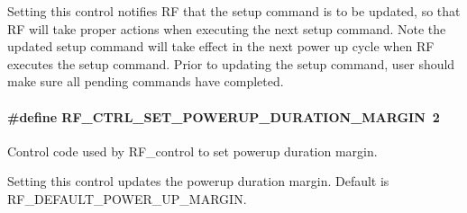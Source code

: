 Setting this control notifies R\+F that the setup command is to be updated, so that R\+F will take proper actions when executing the next setup command. Note the updated setup command will take effect in the next power up cycle when R\+F executes the setup command. Prior to updating the setup command, user should make sure all pending commands have completed. 
\paragraph[{R\+F\+\_\+\+C\+T\+R\+L\+\_\+\+S\+E\+T\+\_\+\+P\+O\+W\+E\+R\+U\+P\+\_\+\+D\+U\+R\+A\+T\+I\+O\+N\+\_\+\+M\+A\+R\+G\+I\+N}]{\setlength{\rightskip}{0pt plus 5cm}\#define R\+F\+\_\+\+C\+T\+R\+L\+\_\+\+S\+E\+T\+\_\+\+P\+O\+W\+E\+R\+U\+P\+\_\+\+D\+U\+R\+A\+T\+I\+O\+N\+\_\+\+M\+A\+R\+G\+I\+N~2}\label{group___r_f___c_t_r_l_ga32bd63d8617c2fde41bbc30d1e8f0db5}


Control code used by R\+F\+\_\+control to set powerup duration margin. 

Setting this control updates the powerup duration margin. Default is R\+F\+\_\+\+D\+E\+F\+A\+U\+L\+T\+\_\+\+P\+O\+W\+E\+R\+\_\+\+U\+P\+\_\+\+M\+A\+R\+G\+I\+N. 